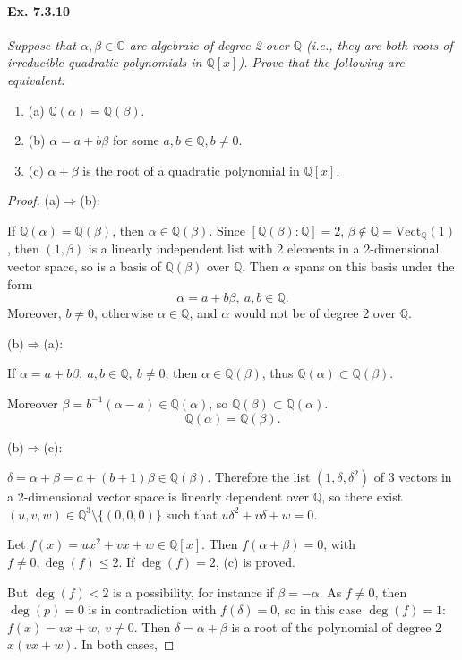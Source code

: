 \documentclass[11pt,a4paper]{article}
\newcommand{\be} {\begin{enumerate}}
\newcommand{\ee} {\end{enumerate}}
\newcommand{\Q}{\mathbb{Q}}
\newcommand{\C}{\mathbb{C}}
\begin{document}
\paragraph{Ex. 7.3.10}

{\it Suppose that $\alpha,\beta \in \C$ are algebraic of degree 2 over $\Q$ (i.e., they are both roots of irreducible quadratic polynomials in $\Q[x]$). Prove that the following are equivalent:
\be
\item[(a)] $\Q(\alpha) = \Q(\beta)$.
\item[(b)] $\alpha = a + b \beta$ for some $a,b \in \Q, b\ne 0$.
\item[(c)] $\alpha + \beta$ is the root of a quadratic polynomial in $\Q[x]$.
\ee
}

\begin{proof}


(a)$\Rightarrow$(b):

If $\Q(\alpha) = \Q(\beta)$, then $\alpha \in \Q(\beta)$. Since $[\Q(\beta):\Q] = 2$, $\beta \not \in \Q = \mathrm{Vect}_\Q(1)$, then $(1,\beta)$ is a linearly independent list with 2 elements in a 2-dimensional vector space, so is a basis of $\Q(\beta)$ over $\Q$. Then $\alpha$ spans on this basis under the form
 $$\alpha= a + b \beta, \ a,b\in \Q.$$
Moreover, $b\neq 0$, otherwise $\alpha \in \Q$, and $\alpha$ would not be of degree 2 over $\Q$.

\bigskip

(b)$\Rightarrow$(a):

If $\alpha = a+b\beta , \ a,b \in \Q, \ b\neq 0$, then $\alpha \in \Q(\beta)$, thus $\Q(\alpha) \subset \Q(\beta)$. 

Moreover $\beta  = b^{-1}(\alpha -a) \in \Q(\alpha)$, so $\Q(\beta) \subset \Q(\alpha)$.
$$\Q(\alpha) = \Q(\beta).$$

\bigskip

(b)$\Rightarrow$(c):

$\delta = \alpha + \beta = a+(b+1) \beta \in \Q(\beta)$. Therefore the list $(1,\delta,\delta^2)$ of 3 vectors in a 2-dimensional vector space is linearly dependent over $\Q$, so there exist $(u,v,w) \in \Q^3 \setminus\{(0,0,0)\}$ such that $u\delta^2 + v\delta + w = 0$.

Let $f(x) = u x^2+vx+w \in \Q[x]$. Then $f(\alpha + \beta) = 0$, with $f\neq 0, \deg(f) \leq 2$. If $\deg(f)=2$, (c) is proved.

But $\deg(f)<2$ is a possibility, for instance if $\beta = -\alpha$. As $f\neq 0$, then  $\deg(p)=0$  is in contradiction with $f(\delta) = 0$,  so in this case $\deg(f) = 1$: $f(x) = vx+w,\ v\neq 0$. Then $\delta=\alpha+ \beta$ is a root of the polynomial of degree 2 $x(vx+w)$. In both cases,


\end{proof}
\end{document}
